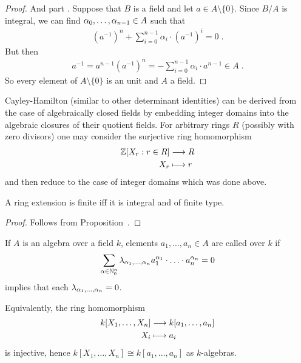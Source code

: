 \documentclass[a4paper,parskip=half,numbers=enddot, DIV=12]{scrreprt}
\begin{document}
\begin{proof}
		And part . Suppose that $B$ is a field and let $a\in A \setminus\{0\}$. Since $B/A$ is integral, we can find $\alpha_0,\ldots, \alpha_{n-1}\in A$ such that 
		\begin{align*}
		\left(a^{-1}\right)^n+\sum_{i=0}^{n-1}\alpha_i\cdot\left(a^{-1}\right)^i = 0\;.
		\end{align*}
		But then 
		\begin{align*}
		a^{-1} = a^{n-1}\left(a^{-1}\right)^n = -\sum_{i=0}^{n-1} \alpha_i\cdot a^{n-1} \in A\;.
		\end{align*}
		So every element of $A\setminus\{0\}$ is an unit and $A$ a field.	
	\end{proof}
	\begin{rem}
		Cayley-Hamilton (similar to other determinant identities) can be derived from the case of algebraically closed fields by embedding integer domains into the algebraic closures of their quotient fields. For arbitrary rings $R$ (possibly with zero divisors) one may consider the surjective ring homomorphism
		\begin{align*}
		\mathbb{Z}[X_r: r\in R] &\longrightarrow R\\
		X_r &\longmapsto r
		\end{align*}
		and then reduce to the case of integer domains which was done above.
	\end{rem}
	
	\begin{cor}
		A ring extension is finite iff it is integral and of finite type.
	\end{cor}
	\begin{proof}
		Follows from Proposition~.
	\end{proof}
	\begin{defi}
		If $A$ is an algebra over a field $k$, elements $a_1,\ldots,a_n\in A$ are called  over $k$ if
		\begin{align*}
		\sum_{\alpha\in \mathbb{N}_0^n} \lambda_{\alpha_1,\ldots, \alpha_n} a_1^{\alpha_1}\cdot\ldots\cdot a_n^{\alpha_n}=0
		\end{align*}
		implies that each $\lambda_{\alpha_1,\ldots, \alpha_n}=0$. 
	\end{defi}
	\begin{rem}
		Equivalently, the ring homomorphism 
		\begin{align*}
		k[X_1,\ldots, X_n]&\longrightarrow k[a_1,\ldots, a_n]\\
		X_i&\longmapsto a_i
		\end{align*}
		is injective, hence $k[X_1,\ldots, X_n]\cong k[a_1,\ldots, a_n]$ as $k$-algebras.
	\end{rem}
	
\end{document}
